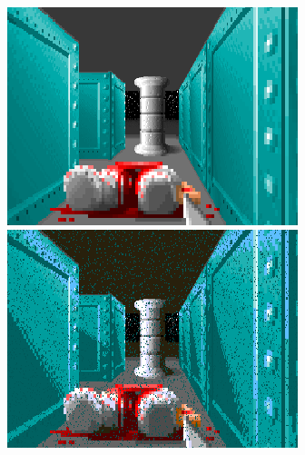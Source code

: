 \begin{minipage}{\textwidth}
\centering
  \includegraphics[width=.9\textwidth]{imgs/fizzlefade/boss/screenshot_60.png} \\
  \vspace*{0.5cm}
  \includegraphics[width=.9\textwidth]{imgs/fizzlefade/boss/screenshot_66.png}  \\
\end{minipage}

